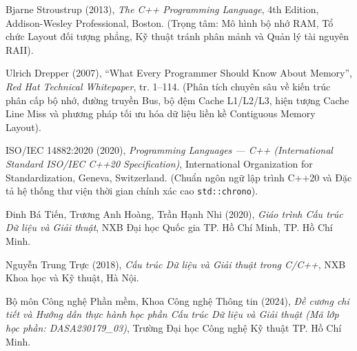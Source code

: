 \documentclass[14pt,a4paper]{extarticle}
\begin{document}
\begin{enumerate}[label={[\arabic*]}, leftmargin=*, itemsep=6pt, parsep=0pt, topsep=4pt]
    \item Bjarne Stroustrup (2013), \textit{The C++ Programming Language}, 4th Edition, Addison-Wesley Professional, Boston. (Trọng tâm: Mô hình bộ nhớ RAM, Tổ chức Layout đối tượng phẳng, Kỹ thuật tránh phân mảnh và Quản lý tài nguyên RAII).
    
    \item Ulrich Drepper (2007), ``What Every Programmer Should Know About Memory'', \textit{Red Hat Technical Whitepaper}, tr. 1--114. (Phân tích chuyên sâu về kiến trúc phân cấp bộ nhớ, đường truyền Bus, bộ đệm Cache L1/L2/L3, hiện tượng Cache Line Miss và phương pháp tối ưu hóa dữ liệu liền kề Contiguous Memory Layout).
    
    \item ISO/IEC 14882:2020 (2020), \textit{Programming Languages --- C++ (International Standard ISO/IEC C++20 Specification)}, International Organization for Standardization, Geneva, Switzerland. (Chuẩn ngôn ngữ lập trình C++20 và Đặc tả hệ thống thư viện thời gian chính xác cao \texttt{std::chrono}).
    
    \item Đinh Bá Tiến, Trương Anh Hoàng, Trần Hạnh Nhi (2020), \textit{Giáo trình Cấu trúc Dữ liệu và Giải thuật}, NXB Đại học Quốc gia TP. Hồ Chí Minh, TP. Hồ Chí Minh.
    
    \item Nguyễn Trung Trực (2018), \textit{Cấu trúc Dữ liệu và Giải thuật trong C/C++}, NXB Khoa học và Kỹ thuật, Hà Nội.
    
    \item Bộ môn Công nghệ Phần mềm, Khoa Công nghệ Thông tin (2024), \textit{Đề cương chi tiết và Hướng dẫn thực hành học phần Cấu trúc Dữ liệu và Giải thuật (Mã lớp học phần: DASA230179\_03)}, Trường Đại học Công nghệ Kỹ thuật TP. Hồ Chí Minh.
\end{enumerate}
\end{document}
